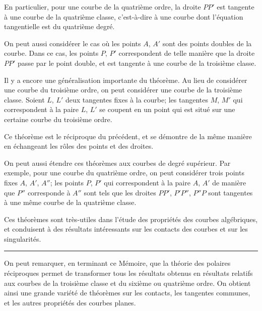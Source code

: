 \documentclass[11pt,a4paper]{article}
\begin{document}
En particulier, pour une courbe de la quatri\`{e}me ordre, la droite $PP'$ est tangente
\`{a} une courbe de la quatri\`{e}me classe, c'est-\`{a}-dire \`{a} une courbe dont l'\'{e}quation tangentielle
est du quatri\`{e}me degr\'{e}.

On peut aussi consid\'{e}rer le cas o\`{u} les points $A$, $A'$ sont des points doubles de la
courbe. Dans ce cas, les points $P$, $P'$ correspondent de telle mani\`{e}re que la droite $PP'$
passe par le point double, et est tangente \`{a} une courbe de la troisi\`{e}me classe.

\newpage
\setcounter{page}{191}

Il y a encore une g\'{e}n\'{e}ralisation importante du th\'{e}or\`{e}me. Au lieu de consid\'{e}rer une
courbe du troisi\`{e}me ordre, on peut consid\'{e}rer une courbe de la troisi\`{e}me classe. Soient
$L$, $L'$ deux tangentes fixes \`{a} la courbe; les tangentes $M$, $M'$ qui correspondent \`{a} la paire
$L$, $L'$ se coupent en un point qui est situ\'{e} sur une certaine courbe du troisi\`{e}me ordre.

Ce th\'{e}or\`{e}me est le r\'{e}ciproque du pr\'{e}c\'{e}dent, et se d\'{e}montre de la m\^{e}me mani\`{e}re en
\'{e}changeant les r\^{o}les des points et des droites.

\newpage
\setcounter{page}{192}

On peut aussi \'{e}tendre ces th\'{e}or\`{e}mes aux courbes de degr\'{e} sup\'{e}rieur. Par exemple,
pour une courbe du quatri\`{e}me ordre, on peut consid\'{e}rer trois points fixes $A$, $A'$, $A''$;
les points $P$, $P'$ qui correspondent \`{a} la paire $A$, $A'$ de mani\`{e}re que $P''$ corresponde \`{a}
$A''$ sont tels que les droites $PP'$, $P'P''$, $P''P$ sont tangentes \`{a} une m\^{e}me courbe de la
quatri\`{e}me classe.

Ces th\'{e}or\`{e}mes sont tr\`{e}s-utiles dans l'\'{e}tude des propri\'{e}t\'{e}s des courbes alg\'{e}briques, et
conduisent \`{a} des r\'{e}sultats int\'{e}ressants sur les contacts des courbes et sur les singularit\'{e}s.

\newpage
\setcounter{page}{193}

\begin{center}
\rule{0.5\textwidth}{0.4pt}
\end{center}

On peut remarquer, en terminant ce M\'{e}moire, que la th\'{e}orie des polaires r\'{e}ciproques
permet de transformer tous les r\'{e}sultats obtenus en r\'{e}sultats relatifs aux courbes de la
troisi\`{e}me classe et du sixi\`{e}me ou quatri\`{e}me ordre. On obtient ainsi une grande vari\'{e}t\'{e} de
th\'{e}or\`{e}mes sur les contacts, les tangentes communes, et les autres propri\'{e}t\'{e}s des courbes
planes.
\end{document}
